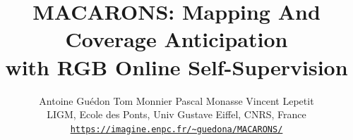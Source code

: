 \documentclass[10pt,twocolumn,letterpaper]{article}
\begin{document}
\title{MACARONS: Mapping And Coverage Anticipation\\ with RGB Online Self-Supervision}

\author{Antoine Guédon \qquad Tom Monnier \qquad Pascal Monasse \qquad Vincent Lepetit\\
LIGM, Ecole des Ponts, Univ Gustave Eiffel, CNRS, France\\
{\tt\small \url{https://imagine.enpc.fr/~guedona/MACARONS/}}
}

\twocolumn[\maketitle\vspace{-3em}\bigbreak]










{\small



}

\newpage

\end{document}
